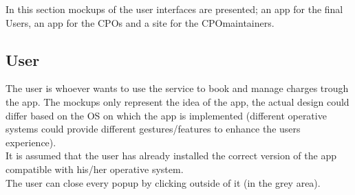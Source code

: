 In this section mockups of the user interfaces are presented; an app for the final Users, an app for the \acp{CPO} and a site for the \ac{CPO}maintainers.
\subsection{User}
The user is whoever wants to use the service to book and manage charges trough the app. The mockups only represent the idea of the app, the actual design could differ based on the OS on which the app is implemented (different operative systems could provide different gestures/features to enhance the users experience).\\
It is assumed that the user has already installed the correct version of the app compatible with his/her operative system.\\
The user can close every popup by clicking outside of it (in the grey area).
